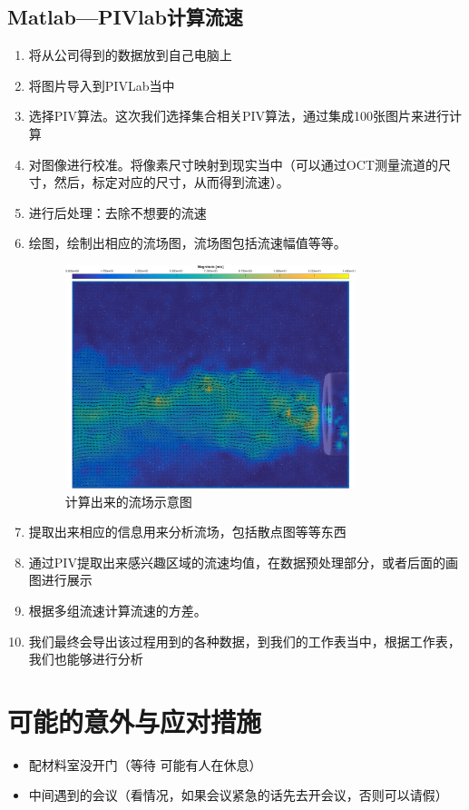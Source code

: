 \documentclass[12pt]{article}
\begin{document}
\subsection{Matlab—PIVlab计算流速}
\begin{enumerate}
    \item 将从公司得到的数据放到自己电脑上
    \item 将图片导入到PIVLab当中
    \item 选择PIV算法。这次我们选择集合相关PIV算法，通过集成100张图片来进行计算
    \item 对图像进行校准。将像素尺寸映射到现实当中（可以通过OCT测量流道的尺寸，然后，标定对应的尺寸，从而得到流速）。
    \item 进行后处理：去除不想要的流速
    \item 绘图，绘制出相应的流场图，流场图包括流速幅值等等。
    
    \begin{figure}[H]
        \centering
        \includegraphics[width=0.8\textwidth]{Images/经过Matlab处理后的图片.png}
        \caption{计算出来的流场示意图}
    \end{figure}
    
    \item 提取出来相应的信息用来分析流场，包括散点图等等东西
    \item 通过PIV提取出来感兴趣区域的流速均值，在数据预处理部分，或者后面的画图进行展示
    \item 根据多组流速计算流速的方差。
    \item 我们最终会导出该过程用到的各种数据，到我们的工作表当中，根据工作表，我们也能够进行分析
\end{enumerate}

\section{可能的意外与应对措施}
\begin{itemize}
    \item 配材料室没开门（等待 可能有人在休息）
    \item 中间遇到的会议（看情况，如果会议紧急的话先去开会议，否则可以请假）
\end{itemize}
\end{document}

